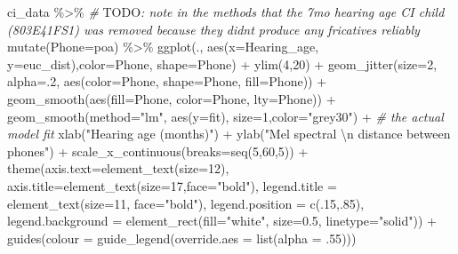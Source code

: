 \documentclass[
]{article}
\newenvironment{Shaded}{\begin{snugshade}}{\end{snugshade}}
\newcommand{\AlertTok}[1]{\textcolor[rgb]{0.94,0.16,0.16}{#1}}
\newcommand{\AttributeTok}[1]{\textcolor[rgb]{0.77,0.63,0.00}{#1}}
\newcommand{\CommentTok}[1]{\textcolor[rgb]{0.56,0.35,0.01}{\textit{#1}}}
\newcommand{\DecValTok}[1]{\textcolor[rgb]{0.00,0.00,0.81}{#1}}
\newcommand{\FloatTok}[1]{\textcolor[rgb]{0.00,0.00,0.81}{#1}}
\newcommand{\FunctionTok}[1]{\textcolor[rgb]{0.00,0.00,0.00}{#1}}
\newcommand{\NormalTok}[1]{#1}
\newcommand{\SpecialCharTok}[1]{\textcolor[rgb]{0.00,0.00,0.00}{#1}}
\newcommand{\StringTok}[1]{\textcolor[rgb]{0.31,0.60,0.02}{#1}}
\begin{document}
\begin{Shaded}
\begin{Highlighting}[]
\NormalTok{ci\_data }\SpecialCharTok{\%\textgreater{}\%} \CommentTok{\# }\AlertTok{TODO}\CommentTok{: note in the methods that the 7mo hearing age CI child (803E41FS1) was removed because they didn\textquotesingle{}t produce any fricatives reliably  }
  \FunctionTok{mutate}\NormalTok{(}\AttributeTok{Phone=}\NormalTok{poa) }\SpecialCharTok{\%\textgreater{}\%}
  \FunctionTok{ggplot}\NormalTok{(., }\FunctionTok{aes}\NormalTok{(}\AttributeTok{x=}\NormalTok{Hearing\_age, }\AttributeTok{y=}\NormalTok{euc\_dist),}\AttributeTok{color=}\NormalTok{Phone, }\AttributeTok{shape=}\NormalTok{Phone) }\SpecialCharTok{+} 
  \FunctionTok{ylim}\NormalTok{(}\DecValTok{4}\NormalTok{,}\DecValTok{20}\NormalTok{) }\SpecialCharTok{+}
  \FunctionTok{geom\_jitter}\NormalTok{(}\AttributeTok{size=}\DecValTok{2}\NormalTok{, }\AttributeTok{alpha=}\NormalTok{.}\DecValTok{2}\NormalTok{, }\FunctionTok{aes}\NormalTok{(}\AttributeTok{color=}\NormalTok{Phone, }\AttributeTok{shape=}\NormalTok{Phone, }\AttributeTok{fill=}\NormalTok{Phone)) }\SpecialCharTok{+} 
  \FunctionTok{geom\_smooth}\NormalTok{(}\FunctionTok{aes}\NormalTok{(}\AttributeTok{fill=}\NormalTok{Phone, }\AttributeTok{color=}\NormalTok{Phone, }\AttributeTok{lty=}\NormalTok{Phone)) }\SpecialCharTok{+}
  \FunctionTok{geom\_smooth}\NormalTok{(}\AttributeTok{method=}\StringTok{"lm"}\NormalTok{, }\FunctionTok{aes}\NormalTok{(}\AttributeTok{y=}\NormalTok{fit), }\AttributeTok{size=}\DecValTok{1}\NormalTok{,}\AttributeTok{color=}\StringTok{"grey30"}\NormalTok{) }\SpecialCharTok{+} \CommentTok{\# the actual model fit}
  \FunctionTok{xlab}\NormalTok{(}\StringTok{"Hearing age (months)"}\NormalTok{) }\SpecialCharTok{+} 
  \FunctionTok{ylab}\NormalTok{(}\StringTok{"Mel spectral }\SpecialCharTok{\textbackslash{}n}\StringTok{ distance between phones"}\NormalTok{) }\SpecialCharTok{+} 
  \FunctionTok{scale\_x\_continuous}\NormalTok{(}\AttributeTok{breaks=}\FunctionTok{seq}\NormalTok{(}\DecValTok{5}\NormalTok{,}\DecValTok{60}\NormalTok{,}\DecValTok{5}\NormalTok{)) }\SpecialCharTok{+}
  \FunctionTok{theme}\NormalTok{(}\AttributeTok{axis.text=}\FunctionTok{element\_text}\NormalTok{(}\AttributeTok{size=}\DecValTok{12}\NormalTok{),}
      \AttributeTok{axis.title=}\FunctionTok{element\_text}\NormalTok{(}\AttributeTok{size=}\DecValTok{17}\NormalTok{,}\AttributeTok{face=}\StringTok{"bold"}\NormalTok{),}
      \AttributeTok{legend.title =} \FunctionTok{element\_text}\NormalTok{(}\AttributeTok{size=}\DecValTok{11}\NormalTok{, }\AttributeTok{face=}\StringTok{"bold"}\NormalTok{),}
      \AttributeTok{legend.position =} \FunctionTok{c}\NormalTok{(.}\DecValTok{15}\NormalTok{,.}\DecValTok{85}\NormalTok{),}
       \AttributeTok{legend.background =} \FunctionTok{element\_rect}\NormalTok{(}\AttributeTok{fill=}\StringTok{"white"}\NormalTok{, }
                                  \AttributeTok{size=}\FloatTok{0.5}\NormalTok{, }\AttributeTok{linetype=}\StringTok{"solid"}\NormalTok{)) }\SpecialCharTok{+}
  \FunctionTok{guides}\NormalTok{(}\AttributeTok{colour =} \FunctionTok{guide\_legend}\NormalTok{(}\AttributeTok{override.aes =} \FunctionTok{list}\NormalTok{(}\AttributeTok{alpha =}\NormalTok{ .}\DecValTok{55}\NormalTok{)))}
\end{Highlighting}
\end{Shaded}
\end{document}
